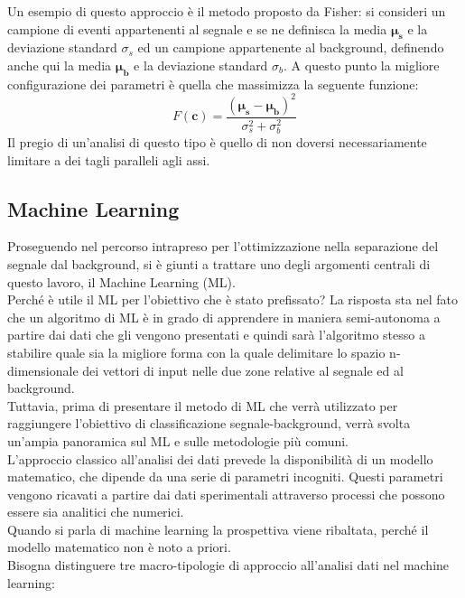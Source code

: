 Un esempio di questo approccio è il metodo proposto da Fisher: si consideri un campione di eventi appartenenti al segnale e se ne definisca la media $\bm\mu_\textbf{s}$ e la deviazione standard $\sigma_s$ ed un campione appartenente al background, definendo anche qui la media $\bm\mu_\textbf{b}$ e la deviazione standard $\sigma_b$. A questo punto la migliore configurazione dei parametri è quella che massimizza la seguente funzione: 
\begin{equation}
F(\textbf{c}) = \frac{(\bm\mu_\textbf{s} - \bm\mu_\textbf{b})^2}{\sigma_s^2 + \sigma_b^2}
\end{equation} 
Il pregio di un'analisi di questo tipo è quello di non doversi necessariamente limitare a dei tagli paralleli agli assi. 

\newpage

\subsection{Machine Learning}
\label{ML}
Proseguendo nel percorso intrapreso per l'ottimizzazione nella separazione del segnale dal background, si è giunti a trattare uno degli argomenti centrali di questo lavoro, il Machine Learning (ML).\\
Perché è utile il ML per l'obiettivo che è stato prefissato? La risposta sta nel fato che un algoritmo di ML è in grado di apprendere in maniera semi-autonoma a partire dai dati che gli vengono presentati e quindi sarà l'algoritmo stesso a stabilire quale sia la migliore forma con la quale delimitare lo spazio n-dimensionale dei vettori di input nelle due zone relative al segnale ed al background. \\
Tuttavia, prima di presentare il metodo di ML che verrà utilizzato per raggiungere l'obiettivo di classificazione segnale-background, verrà svolta un'ampia panoramica sul ML e sulle metodologie più comuni. \\
L'approccio classico all'analisi dei dati prevede la disponibilità di un modello matematico, che dipende da una serie di parametri incogniti. Questi parametri vengono ricavati a partire dai dati sperimentali attraverso processi che possono essere sia analitici che numerici. \\
Quando si parla di machine learning la prospettiva viene ribaltata, perché il modello matematico non è noto a priori. \\
Bisogna distinguere tre macro-tipologie di approccio all'analisi dati nel machine learning:
